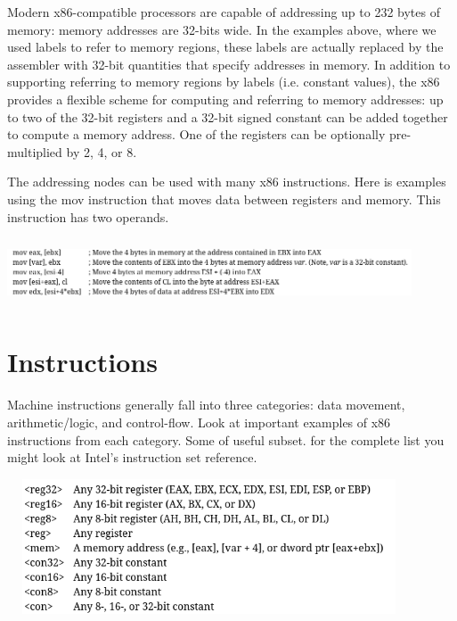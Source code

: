\documentclass[12pt]{extarticle}
\begin{document}
 Modern x86-compatible processors are capable of addressing up to 232 bytes of memory: memory addresses are 32-bits wide. In the examples above, where we used labels to refer to memory regions, these labels are actually replaced by the assembler with 32-bit quantities that specify addresses in memory. In addition to supporting referring to memory regions by labels (i.e. constant values), the x86 provides a flexible scheme for computing and referring to memory addresses: up to two of the 32-bit registers and a 32-bit signed constant can be added together to compute a memory address. One of the registers can be optionally pre-multiplied by 2, 4, or 8.

The addressing nodes can be used with many x86 instructions. Here is examples using the mov instruction that moves data between registers and memory. This instruction has two operands.

\begin{center}

    \includegraphics[width=12cm, height=2cm]{dec2}

    
 \end{center}

 \section{Instructions}

 Machine instructions generally fall into three categories: data movement, arithmetic/logic, and control-flow. Look at important examples of 
 x86 instructions from each category. Some of useful subset. for the complete list you might look at Intel's instruction set reference.

 \begin{center}

    \includegraphics[width=12cm, height=4cm]{dec3}
    
 \end{center}
\end{document}
